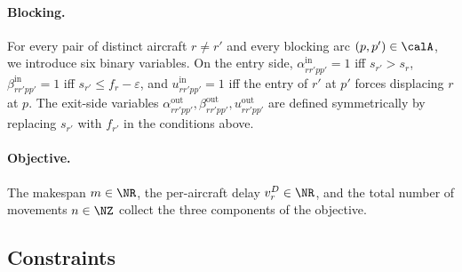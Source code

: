 \paragraph{Blocking.}
For every pair of distinct aircraft $r \ne r'$ and every blocking arc
$(p, p') \in \calA$, we introduce six binary variables.  On the entry
side, $\alpha^{\mathrm{in}}_{rr'pp'} = 1$ iff $s_{r'} > s_r$,
$\beta^{\mathrm{in}}_{rr'pp'} = 1$ iff $s_{r'} \le f_r - \varepsilon$, and
$u^{\mathrm{in}}_{rr'pp'} = 1$ iff the entry of $r'$ at $p'$ forces
displacing $r$ at $p$.  The exit-side variables
$\alpha^{\mathrm{out}}_{rr'pp'}, \beta^{\mathrm{out}}_{rr'pp'},
u^{\mathrm{out}}_{rr'pp'}$ are defined symmetrically by replacing $s_{r'}$
with $f_{r'}$ in the conditions above.

\paragraph{Objective.}
The makespan $m \in \NR$, the per-aircraft delay $v^D_r \in \NR$, and the
total number of movements $n \in \NZ$ collect the three components of the
objective.

\subsection*{Constraints}

